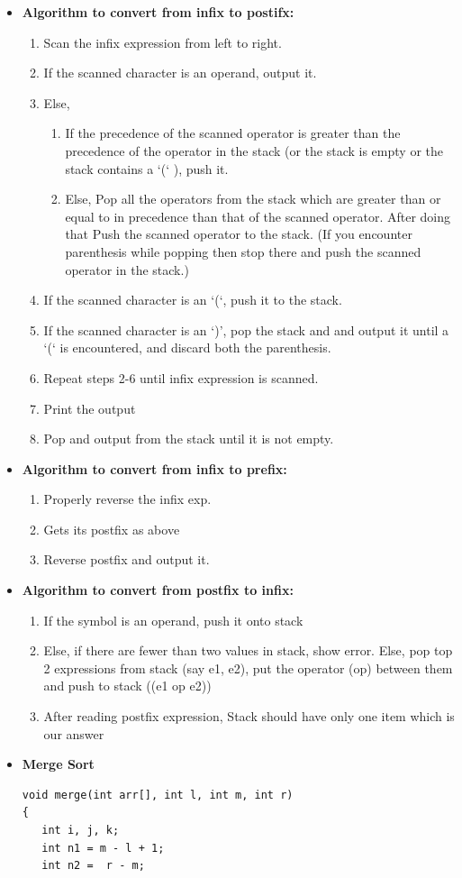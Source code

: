 \documentclass[8pt, a4paper, oneside, twocolumn]{extarticle}
\begin{document}
\begin{itemize}
\begin{verbatim}
    \end{verbatim}
    \item \textbf{Algorithm to convert from infix to postifx: }
        \begin{enumerate}
        \item Scan the infix expression from left to right.
        \item If the scanned character is an operand, output it.
        \item Else,
            \begin{enumerate}
            \item If the precedence of the scanned operator is greater than the precedence of the operator in the stack (or the stack is empty or the stack contains a ‘(‘ ), push it.
            \item  Else, Pop all the operators from the stack which are greater than or equal to in precedence than that of the scanned operator. After doing that Push the scanned operator to the stack. (If you encounter parenthesis while popping then stop there and push the scanned operator in the stack.)
            \end{enumerate}
        \item If the scanned character is an ‘(‘, push it to the stack.
        \item If the scanned character is an ‘)’, pop the stack and and output it until a ‘(‘ is encountered, and discard both the parenthesis.
        \item Repeat steps 2-6 until infix expression is scanned.
        \item Print the output
        \item Pop and output from the stack until it is not empty.
        \end{enumerate}
    \item \textbf{Algorithm to convert from infix to prefix: }
        \begin{enumerate}
        \item Properly reverse the infix exp.
        \item Gets its postfix as above
        \item Reverse postfix and output it.
        \end{enumerate}
    \item \textbf{Algorithm to convert from postfix to infix: }
        \begin{enumerate}
        \item If the symbol is an operand, push it onto stack
        \item Else, if there are fewer than two values in stack, show error. Else, pop top 2 expressions from stack (say e1, e2), put the operator (op) between them and push to stack ((e1 op e2))
        \item After reading postfix expression, Stack should have only one item which is our answer 
        \end{enumerate}
    \item \textbf{Merge Sort}
    \begin{verbatim}
void merge(int arr[], int l, int m, int r)
{
   int i, j, k;
   int n1 = m - l + 1;
   int n2 =  r - m;


\end{verbatim}
\end{itemize}
\end{document}
